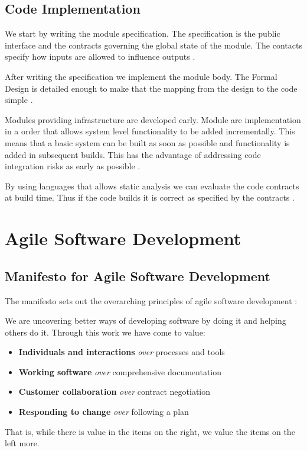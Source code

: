 \subsection{Code Implementation}
We start by writing the module specification. The specification is the public 
interface and the contracts governing the global state of the module. The contacts
specify how inputs are allowed to influence outputs \parencite{Tokeneer}. 

After writing the specification we implement the module body. The Formal Design is
detailed enough to make that the mapping from the design to the code simple 
\parencite{Tokeneer}.

Modules providing infrastructure are developed early. Module are implementation 
in a order that allows system level functionality to be added incrementally. This
means that a basic system can be built as soon as possible and functionality is 
added in subsequent builds. This has the advantage of addressing code integration
risks as early as possible \parencite{Tokeneer}.

By using languages that allows static analysis we can evaluate the code 
contracts at build time. Thus if the code builds it is correct as specified by the
contracts \parencite{Tokeneer}.

\section{Agile Software Development}

\subsection{Manifesto for Agile Software Development}

The manifesto sets out the overarching principles of agile software development \parencite{Beck2001ManifestoFA}:

\begin{displayquote}
We are uncovering better ways of developing software by doing it and helping 
others do it. Through this work we have come to value:

\begin{itemize}
	\item \textbf{Individuals and interactions} \textit{over} processes and tools 
	\item \textbf{Working software} \textit{over} comprehensive documentation 
	\item \textbf{Customer collaboration} \textit{over} contract negotiation 
	\item \textbf{Responding to change} \textit{over} following a plan 
\end{itemize}

That is, while there is value in the items on the right, we value the items on
the left more.
\end{displayquote}

